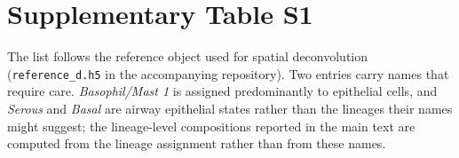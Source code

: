 \clearpage
\section*{Supplementary Table S1}



\noindent\footnotesize
The list follows the reference object used for spatial deconvolution
(\texttt{reference\_d.h5} in the accompanying repository). Two entries carry names that
require care. \emph{Basophil/Mast 1} is assigned predominantly to epithelial cells, and
\emph{Serous} and \emph{Basal} are airway epithelial states rather than the lineages their
names might suggest; the lineage-level compositions reported in the main text are computed
from the lineage assignment rather than from these names.
